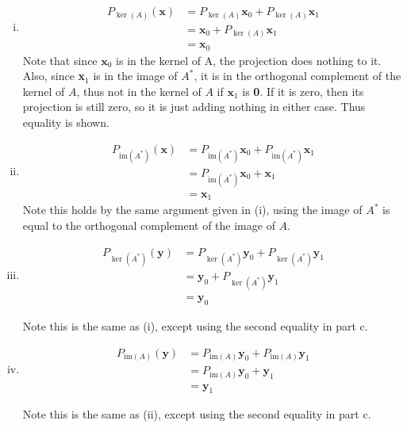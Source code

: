 \begin{solution}
    
    \begin{enumerate}[(i)]
        \item 
        \begin{align*}
            P_{\ker (A)}(\textbf{x}) &= P_{\ker (A)}\textbf{x}_0 + P_{\ker (A)}\textbf{x}_1\\
            &= \textbf{x}_0 + P_{\ker (A)}\textbf{x}_1\\
            &= \textbf{x}_0
        \end{align*}
        Note that since $\textbf{x}_0$ is in the kernel of A, the projection does nothing to it. Also, since \textbf{x}$_1$ is in the image of $A^*$, it is in the orthogonal complement of the kernel of $A$, thus not in the kernel of $A$ if $\textbf{x}_1$ is \textbf{0}. If it is zero, then its projection is still zero, so it is just adding nothing in either case. Thus equality is shown.

        \item 
        \begin{align*}
            P_{\text{im}(A^*)}(\textbf{x}) &= P_{\text{im}(A^*)}\textbf{x}_0 + P_{\text{im}(A^*)}\textbf{x}_1\\
            &= P_{\text{im}(A^*)}\textbf{x}_0 + \textbf{x}_1\\
            &= \textbf{x}_1
        \end{align*}
        Note this holds by the same argument given in (i), using the image of $A^*$ is equal to the orthogonal complement of the image of $A$.

        \item 
        \begin{align*}
            P_{\ker (A^*)}(\textbf{y}) &= P_{\ker (A^*)}\textbf{y}_0 + P_{\ker (A^*)}\textbf{y}_1\\
            &= \textbf{y}_0 + P_{\ker (A^*)}\textbf{y}_1\\
            &= \textbf{y}_0
        \end{align*}

        Note this is the same as (i), except using the second equality in part c.

        \item
        \begin{align*}
            P_{\text{im}(A)}(\textbf{y}) &= P_{\text{im}(A)}\textbf{y}_0 + P_{\text{im}(A)}\textbf{y}_1\\
            &= P_{\text{im}(A)}\textbf{y}_0 + \textbf{y}_1\\
            &= \textbf{y}_1    
        \end{align*}

            Note this is the same as (ii), except using the second equality in part c.
    \end{enumerate}
\end{solution}

